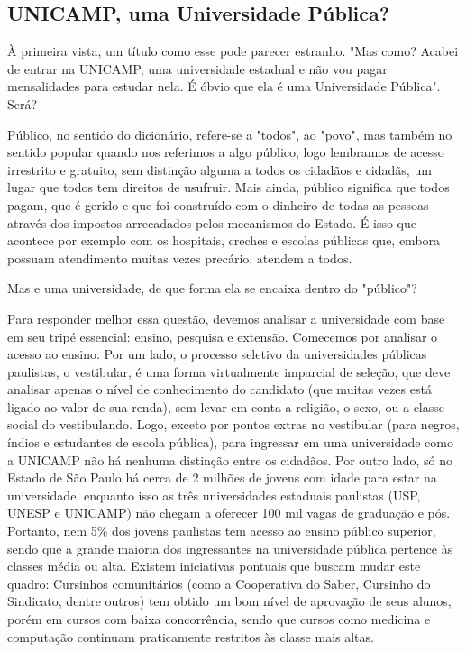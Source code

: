 \subsection{UNICAMP, uma Universidade Pública?} À primeira vista, um título como
esse pode parecer estranho. "Mas como? Acabei de entrar na UNICAMP, uma
universidade estadual e não vou pagar mensalidades para estudar nela. É óbvio
que ela é uma Universidade Pública". Será?

Público, no sentido do dicionário, refere-se a "todos", ao "povo", mas também no
sentido popular quando nos referimos a algo público, logo lembramos de acesso
irrestrito e gratuito, sem distinção alguma a todos os cidadãos e cidadãs, um
lugar que todos tem direitos de usufruir. Mais ainda, público significa que
todos pagam, que é gerido e que foi construído com o dinheiro de todas as
pessoas através dos impostos arrecadados pelos mecanismos do Estado. É isso que
acontece por exemplo com os hospitais, creches e escolas públicas que, embora
possuam atendimento muitas vezes precário, atendem a todos.

Mas e uma universidade, de que forma ela se encaixa dentro do "público"?

Para responder melhor essa questão, devemos analisar a universidade com base em
seu tripé essencial: ensino, pesquisa e extensão. Comecemos por analisar
o acesso ao ensino. Por um lado, o processo seletivo da universidades públicas
paulistas, o vestibular, é uma forma virtualmente imparcial de seleção, que deve
analisar apenas o nível de conhecimento do candidato (que muitas vezes está
ligado ao valor de sua renda), sem levar em conta a religião, o sexo, ou
a classe social do vestibulando. Logo, exceto por pontos extras no vestibular
(para negros, índios e estudantes de escola pública), para ingressar em uma
universidade como a UNICAMP não há nenhuma distinção entre os cidadãos. Por
outro lado, só no Estado de São Paulo há cerca de 2 milhões de jovens com idade
para estar na universidade, enquanto isso as três universidades estaduais
paulistas (USP, UNESP e UNICAMP) não chegam a oferecer 100 mil vagas de
graduação e pós. Portanto, nem 5\% dos jovens paulistas tem acesso ao ensino
público superior, sendo que a grande maioria dos ingressantes na universidade
pública pertence às classes média ou alta. Existem iniciativas pontuais que
buscam mudar este quadro: Cursinhos comunitários (como a Cooperativa do Saber,
Cursinho do Sindicato, dentre outros) tem obtido um bom nível de aprovação de
seus alunos, porém em cursos com baixa concorrência, sendo que cursos como
medicina e computação continuam praticamente restritos às classe mais altas.

